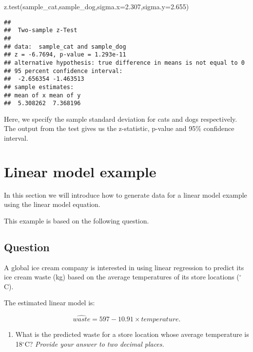 \documentclass[
]{book}
\newenvironment{Shaded}{\begin{snugshade}}{\end{snugshade}}
\newcommand{\AttributeTok}[1]{\textcolor[rgb]{0.77,0.63,0.00}{#1}}
\newcommand{\FloatTok}[1]{\textcolor[rgb]{0.00,0.00,0.81}{#1}}
\newcommand{\FunctionTok}[1]{\textcolor[rgb]{0.00,0.00,0.00}{#1}}
\newcommand{\NormalTok}[1]{#1}
\providecommand{\tightlist}{%
  \setlength{\itemsep}{0pt}\setlength{\parskip}{0pt}}
\begin{document}
\begin{Shaded}
\begin{Highlighting}[]
\FunctionTok{z.test}\NormalTok{(sample\_cat,sample\_dog,}\AttributeTok{sigma.x=}\FloatTok{2.307}\NormalTok{,}\AttributeTok{sigma.y=}\FloatTok{2.655}\NormalTok{)}
\end{Highlighting}
\end{Shaded}

\begin{verbatim}
## 
##  Two-sample z-Test
## 
## data:  sample_cat and sample_dog
## z = -6.7694, p-value = 1.293e-11
## alternative hypothesis: true difference in means is not equal to 0
## 95 percent confidence interval:
##  -2.656354 -1.463513
## sample estimates:
## mean of x mean of y 
##  5.308262  7.368196
\end{verbatim}

Here, we specify the sample standard deviation for cats and dogs respectively. The output from the test gives us the z-statistic, p-value and 95\% confidence interval.

\hypertarget{linear-model-example}{%
\chapter{Linear model example}\label{linear-model-example}}

In this section we will introduce how to generate data for a linear model example using the linear model equation.

This example is based on the following question.

\hypertarget{question}{%
\section{Question}\label{question}}

A global ice cream company is interested in using linear regression to predict its ice cream waste (kg) based on the average temperatures of its store locations (\(^{\circ}\)C).

The estimated linear model is:

\[\hat{waste} = 597 - 10.91 \times temperature.\]

\begin{enumerate}
\def\labelenumi{\arabic{enumi}.}
\tightlist
\item
  What is the predicted waste for a store location whose average temperature is 18\(^{\circ}\)C? \emph{Provide your answer to two decimal places.}
\end{enumerate}
\end{document}
